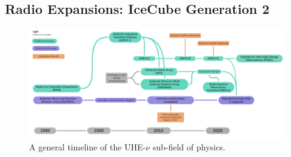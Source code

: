 \documentclass[../../../main.tex]{subfiles}
\begin{document}
\subsection{Radio Expansions: IceCube Generation 2}
\label{sec:gen2}

\begin{figure}
\centering
\includegraphics[width=\textwidth]{figures/timeline.pdf}
\caption{\label{fig:flow} A general timeline of the UHE-$\nu$ sub-field of physics.}
\end{figure}
\end{document}
